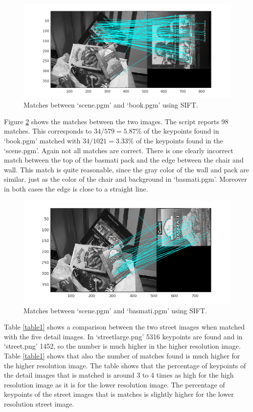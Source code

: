 \documentclass{article}
\begin{document}
\begin{figure}[H]
 \centering
 \includegraphics[width=1\textwidth]{matches.png}
 \caption{Matches between `scene.pgm' and `book.pgm' using SIFT.}
 \label{fig2}
\end{figure}

Figure \ref{fig3} shows the matches between the two images. The script reports 98 matches. This corresponds to $34/579 = 5.87\%$ of the keypoints found in `book.pgm' matched with $34/1021 = 3.33\%$ of the keypoints found in the `scene.pgm'. Again not all matches are correct. There is one clearly incorrect match between the top of the basmati pack and the edge between the chair and wall. This match is quite reasonable, since the gray color of the wall and pack are similar, just as the color of the chair and background in `basmati.pgm'. Moreover in both cases the edge is close to a straight line.
\begin{figure}[H]
 \centering
 \includegraphics[width=1\textwidth]{matches2.png}
 \caption{Matches between `scene.pgm' and `basmati.pgm' using SIFT.}
 \label{fig3}
\end{figure}

Table \ref{table1} shows a comparison between the two street images when matched with the five detail images. In `streetlarge.png' 5316 keypoints are found and in `street.png' 1452, so the number is much higher in the higher resolution image. Table \ref{table1} shows that also the number of matches found is much higher for the higher resolution image. The table shows that the percentage of keypoints of the detail images that is matched is around 3 to 4 times as high for the high resolution image as it is for the lower resolution image. The percentage of keypoints of the street images that is matches is slightly higher for the lower resolution street image.
\end{document}
